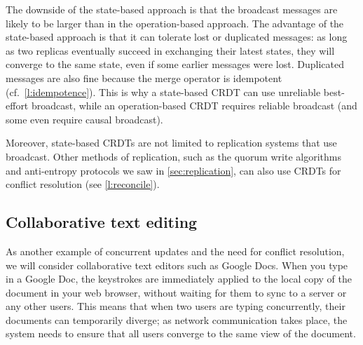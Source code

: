 The downside of the state-based approach is that the broadcast messages are likely to be larger than in the operation-based approach.
The advantage of the state-based approach is that it can tolerate lost or duplicated messages: as long as two replicas eventually succeed in exchanging their latest states, they will converge to the same state, even if some earlier messages were lost.
Duplicated messages are also fine because the merge operator is idempotent (cf.\ \autoref{l:idempotence}).
This is why a state-based CRDT can use unreliable best-effort broadcast, while an operation-based CRDT requires reliable broadcast (and some even require causal broadcast).

Moreover, state-based CRDTs are not limited to replication systems that use broadcast.
Other methods of replication, such as the quorum write algorithms and anti-entropy protocols we saw in \autoref{sec:replication}, can also use CRDTs for conflict resolution (see \autoref{l:reconcile}).

\subsection{Collaborative text editing}

As another example of concurrent updates and the need for conflict resolution, we will consider collaborative text editors such as Google Docs.
When you type in a Google Doc, the keystrokes are immediately applied to the local copy of the document in your web browser, without waiting for them to sync to a server or any other users.
This means that when two users are typing concurrently, their documents can temporarily diverge; as network communication takes place, the system needs to ensure that all users converge to the same view of the document.

\begin{frame}[plain]
    \label{s:google-docs}
\end{frame}
\label{l:google-docs}

